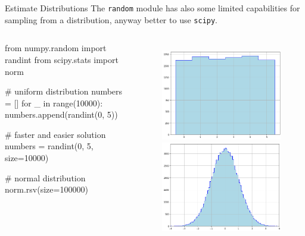 \documentclass{beamer}
\begin{document}
\begin{frame}[fragile]{Estimate Distributions}
The \texttt{random} module has also some limited capabilities for sampling from a distribution, anyway 
better to use \texttt{scipy}.

\begin{columns}
\begin{ipython}
from numpy.random import randint
from scipy.stats import norm

# uniform distribution
numbers = []
for _ in range(10000):
    numbers.append(randint(0, 5))

# faster and easier solution
numbers = randint(0, 5, size=10000)    
    
# normal distribution
norm.rsv(size=100000)   
\end{ipython}
\begin{figure}[h]
    \begin{center}
    \includegraphics[width=0.55\linewidth]{uniform_distro}\\
    \includegraphics[width=0.55\linewidth]{gauss_distro}
    \end{center}
\end{figure}    
\end{columns}
\end{frame}
\end{document}
